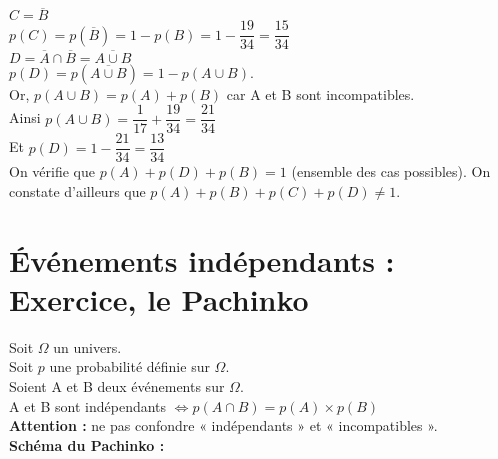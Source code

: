 $ C = \overline{B} $ \\

$ p\left(C\right) = p\left(\overline{B} \right) = 1 - p\left(B\right) = 1 - \dfrac{19}{34} = \dfrac{15}{34} $ \\

$ D = \overline{A} \cap \overline{B} = \overline{A \cup B} $ \\

$ p\left(D\right) = p\left(\overline{A\cup B}\right) = 1 - p\left(A\cup B\right)$.  \\

Or, $p\left(A\cup B\right) = p\left(A\right) + p\left(B\right) $ car A et B sont incompatibles. \\

Ainsi $p\left(A\cup B\right) = \dfrac{1}{17} + \dfrac{19}{34} = \dfrac{21}{34} $ \\

Et $p\left(D\right) = 1 - \dfrac{21}{34} = \dfrac{13}{34} $ \\

On vérifie que $p\left(A\right) + p\left(D\right) + p\left(B\right) = 1$ (ensemble des cas possibles). On constate d'ailleurs que $p\left(A\right) + p\left(B\right) + p\left(C\right) + p\left(D\right) \neq 1 $.

\newpage

\section{Événements indépendants : Exercice, le Pachinko}

Soit $\Omega$ un univers. \\ Soit $p$ une probabilité définie sur $\Omega$. \\ Soient A et B deux événements sur $\Omega$. \\

A et B sont indépendants $ \Longleftrightarrow p\left(A \cap B \right) = p\left(A\right) \times p\left(B\right) $ \\

\textbf{Attention :} ne pas confondre « indépendants » et « incompatibles ». \\

\textbf{Schéma du Pachinko :}


